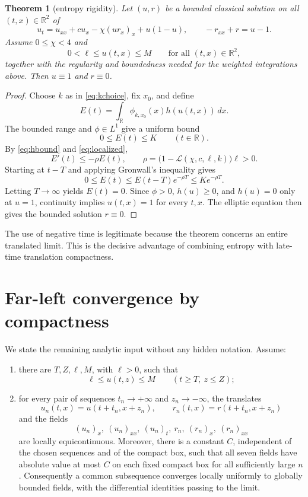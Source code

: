 \documentclass[11pt]{article}
\newcommand{\R}{\mathbb{R}}
\newtheorem{theorem}{Theorem}
\begin{document}
\begin{theorem}[entropy rigidity]
Let \((u,r)\) be a bounded classical solution on all
\((t,x)\in\R^2\) of
\[
 u_t=u_{xx}+cu_x-\chi(ur_x)_x+u(1-u),
 \qquad -r_{xx}+r=u-1.
\]
Assume \(0\le\chi<4\) and
\[
 0<\ell\le u(t,x)\le M
 \qquad\text{for all }(t,x)\in\R^2,
\]
together with the regularity and boundedness needed for the weighted
integrations above.  Then \(u\equiv1\) and \(r\equiv0\).
\end{theorem}

\begin{proof}
Choose \(k\) as in \eqref{eq:kchoice}, fix \(x_0\), and define
\[
 E(t)=\int_\R\phi_{k,x_0}(x)h(u(t,x))\,dx.
\]
The bounded range and \(\phi\in L^1\) give a uniform bound
\[
 0\le E(t)\le K\qquad(t\in\R).
\]
By \eqref{eq:hbound} and \eqref{eq:localized},
\[
 E'(t)\le-\rho E(t),\qquad
 \rho=\bigl(1-\mathcal L(\chi,c,\ell,k)\bigr)\ell>0.
\]
Starting at \(t-T\) and applying Gronwall's inequality gives
\[
 0\le E(t)\le E(t-T)e^{-\rho T}\le Ke^{-\rho T}.
\]
Letting \(T\to\infty\) yields \(E(t)=0\).  Since \(\phi>0\),
\(h(u)\ge0\), and \(h(u)=0\) only at \(u=1\), continuity implies
\(u(t,x)=1\) for every \(t,x\).  The elliptic equation then gives the
bounded solution \(r\equiv0\).
\end{proof}

The use of negative time is legitimate because the theorem concerns an
entire translated limit.  This is the decisive advantage of combining
entropy with late-time translation compactness.

\section{Far-left convergence by compactness}

We state the remaining analytic input without any hidden notation.
Assume:
\begin{enumerate}[label=\textup{(H\arabic*)},leftmargin=2.8em]
\item there are \(T,Z,\ell,M\), with \(\ell>0\), such that
\begin{equation}
 \ell\le u(t,z)\le M
 \qquad(t\ge T,\ z\le Z);                              \label{eq:band}
\end{equation}
\item for every pair of sequences \(t_n\to+\infty\) and
  \(z_n\to-\infty\), the translates
\[
 u_n(t,x)=u(t+t_n,x+z_n),\qquad
 r_n(t,x)=r(t+t_n,x+z_n)
\]
and the fields
\[
 (u_n)_x,\ (u_n)_{xx},\ (u_n)_t,\ r_n,\ (r_n)_x,\
 (r_n)_{xx}
\]
are locally equicontinuous.  Moreover, there is a constant \(C\), independent
of the chosen sequences and of the compact box, such that all seven fields
have absolute value at most \(C\) on each fixed compact box for all
sufficiently large \(n\).  Consequently a common subsequence converges
locally uniformly to globally bounded fields, with the differential
identities passing to the limit.
\end{enumerate}
\end{document}
